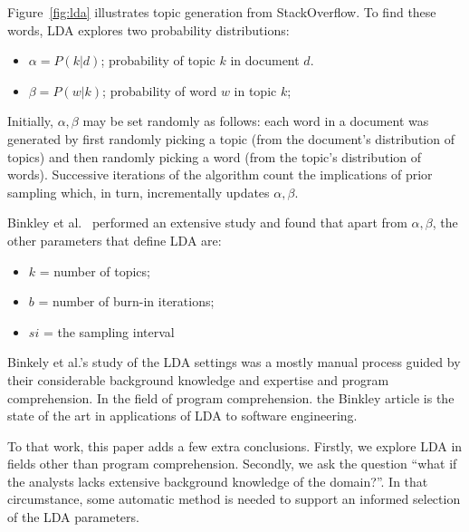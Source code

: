 \documentclass[twocolumn,5p,sort&compress]{elsarticle}
\newcommand{\bi}{\begin{itemize}}
\newcommand{\ei}{\end{itemize}}
\theoremstyle{break}
\begin{document}
Figure~\ref{fig:lda} illustrates topic generation from StackOverflow.
To find these words, LDA explores two probability distributions:
\bi
\item $\alpha=P(k|d)$; probability of topic $k$ in  document $d$.
\item $\beta=P(w|k)$; probability of word $w$ in topic $k$; 
\ei
  Initially, $\alpha,\beta$ may be set randomly as follows:
each word in a document was generated by first randomly picking a topic (from
the document’s distribution of topics) and then randomly picking a word (from
the topic’s distribution of words). Successive iterations of the algorithm 
count the implications of prior sampling which, in turn,  incrementally updates $\alpha,\beta$.

Binkley et al.~\cite{binkley2014understanding} performed an extensive study and found that 
apart from $\alpha,\beta$, the other parameters that define LDA
are:
\bi
\item $k$ = number of topics;
\item $b$ = number of burn-in iterations;
\item $si$ = the sampling interval
\ei
Binkely et al.'s study of the LDA settings was a mostly manual process
guided by their considerable background knowledge and expertise and program
comprehension.
In the field of program comprehension. the Binkley article
is the state of the art in applications of LDA to software engineering.

To that work, this paper adds a few extra conclusions.
Firstly, we explore LDA in fields other than program comprehension.
Secondly, we ask the question ``what if the analysts lacks extensive background knowledge
of the domain?''. In that circumstance, some automatic method is needed to support
an informed selection of the LDA parameters.

 
\end{document}
